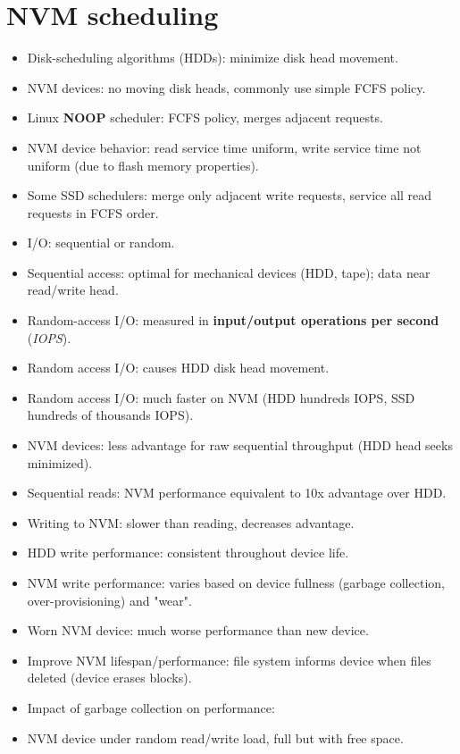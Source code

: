 \section{NVM scheduling}

\begin{itemize}
    \item Disk-scheduling algorithms (HDDs): minimize disk head movement.
    \item NVM devices: no moving disk heads, commonly use simple FCFS policy.
    \item Linux \textbf{NOOP} scheduler: FCFS policy, merges adjacent requests.
    \item NVM device behavior: read service time uniform, write service time not uniform (due to flash memory properties).
    \item Some SSD schedulers: merge only adjacent write requests, service all read requests in FCFS order.
    \item I/O: sequential or random.
    \item Sequential access: optimal for mechanical devices (HDD, tape); data near read/write head.
    \item Random-access I/O: measured in \textbf{input/output operations per second} (\textit{IOPS}).
    \item Random access I/O: causes HDD disk head movement.
    \item Random access I/O: much faster on NVM (HDD hundreds IOPS, SSD hundreds of thousands IOPS).
    \item NVM devices: less advantage for raw sequential throughput (HDD head seeks minimized).
    \item Sequential reads: NVM performance equivalent to 10x advantage over HDD.
    \item Writing to NVM: slower than reading, decreases advantage.
    \item HDD write performance: consistent throughout device life.
    \item NVM write performance: varies based on device fullness (garbage collection, over-provisioning) and "wear".
    \item Worn NVM device: much worse performance than new device.
    \item Improve NVM lifespan/performance: file system informs device when files deleted (device erases blocks).
    \item Impact of garbage collection on performance:
    \item NVM device under random read/write load, full but with free space.

\end{itemize}
